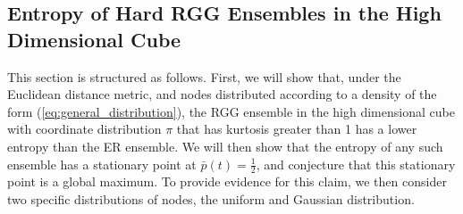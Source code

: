 \documentclass{article}
\begin{document}
\subsection{Entropy of Hard RGG Ensembles in the High Dimensional Cube}
This section is structured as follows. First, we will show that, under the Euclidean distance metric, and nodes distributed according to a density of the form (\ref{eq:general_distribution}), the RGG ensemble in the high dimensional cube with coordinate distribution $\pi$ that has kurtosis greater than 1 has a lower entropy than the ER ensemble. We will then show that the entropy of any such ensemble has a stationary point at $\bar{p}(t)=\frac{1}{2}$, and conjecture that this stationary point is a global maximum. To provide evidence for this claim, we then consider two specific distributions of nodes, the uniform and Gaussian distribution.
\end{document}
